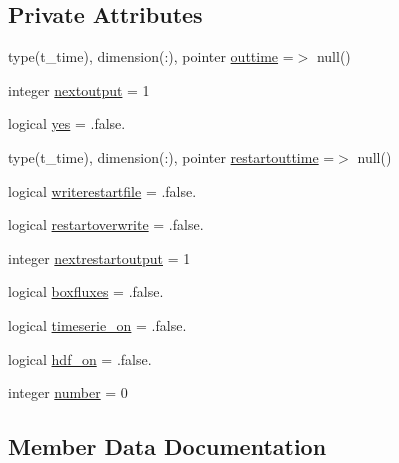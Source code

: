 \subsection*{Private Attributes}
\begin{DoxyCompactItemize}
\item 
type(t\+\_\+time), dimension(\+:), pointer \mbox{\hyperlink{structmodulesnow_1_1t__output_a61035c4527122292be8bf875858fc78a}{outtime}} =$>$ null()
\item 
integer \mbox{\hyperlink{structmodulesnow_1_1t__output_ab0fdc889ab86ae6a6157869a90e35b0b}{nextoutput}} = 1
\item 
logical \mbox{\hyperlink{structmodulesnow_1_1t__output_ac636a0dc496fc5873415c6c190b765a2}{yes}} = .false.
\item 
type(t\+\_\+time), dimension(\+:), pointer \mbox{\hyperlink{structmodulesnow_1_1t__output_a85d322af45ea901a013a42483e1304e6}{restartouttime}} =$>$ null()
\item 
logical \mbox{\hyperlink{structmodulesnow_1_1t__output_a3ff115e0e147fb37d1fd96a6b6d45c1e}{writerestartfile}} = .false.
\item 
logical \mbox{\hyperlink{structmodulesnow_1_1t__output_a0ec0897d7153696913bae6184b678128}{restartoverwrite}} = .false.
\item 
integer \mbox{\hyperlink{structmodulesnow_1_1t__output_acd09b1185d3408be7ddd58c59dc0ea9e}{nextrestartoutput}} = 1
\item 
logical \mbox{\hyperlink{structmodulesnow_1_1t__output_a64998984a989b8f427f4a0974f7948bb}{boxfluxes}} = .false.
\item 
logical \mbox{\hyperlink{structmodulesnow_1_1t__output_af562aad92f3a12982f7a9abbd7e8cdad}{timeserie\+\_\+on}} = .false.
\item 
logical \mbox{\hyperlink{structmodulesnow_1_1t__output_a6b6db7bd2ffab8241c770cef54984426}{hdf\+\_\+on}} = .false.
\item 
integer \mbox{\hyperlink{structmodulesnow_1_1t__output_ae9271136fbae265b267870307b5a3df7}{number}} = 0
\end{DoxyCompactItemize}


\subsection{Member Data Documentation}
\mbox{\label{structmodulesnow_1_1t__output_a64998984a989b8f427f4a0974f7948bb}} 
